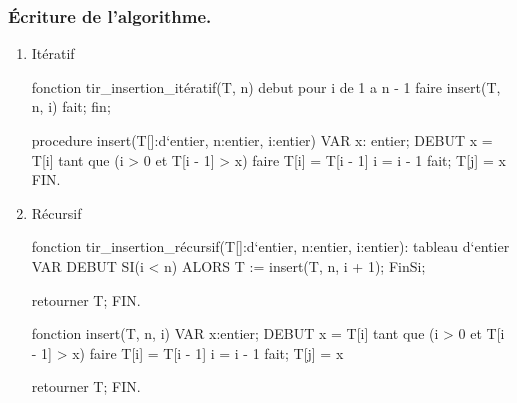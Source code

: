 \documentclass[12pt]{article}
\begin{document}
\subsubsection{Écriture de l'algorithme.}
\begin{enumerate}
	\item Itératif
	
	\begin{sql}
fonction tir_insertion_itératif(T, n)
debut
	pour i de 1 a n - 1
	faire
		insert(T, n, i)
	fait;
fin;



procedure insert(T[]:d`entier, n:entier, i:entier)
	VAR
		x: entier;
	DEBUT
		x = T[i]
		tant que (i > 0 et T[i - 1] > x)
		faire
			T[i] = T[i - 1]
			i = i - 1
		fait;
		T[j] = x
	FIN.
	\end{sql}
	
	\item Récursif
	
	\begin{sql}
fonction tir_insertion_récursif(T[]:d`entier, n:entier, i:entier): tableau d`entier
	VAR
	DEBUT
		SI(i < n)
		ALORS T := insert(T, n, i + 1);
		FinSi;
		
		retourner T;
	FIN.


fonction insert(T, n, i)
	VAR
		x:entier;
	DEBUT
		x = T[i]
		tant que (i > 0 et T[i - 1] > x)
		faire
			T[i] = T[i - 1]
			i = i - 1
		fait;
		T[j] = x
		
		retourner T;
	FIN.
	\end{sql}
	
\end{enumerate}
\end{document}
